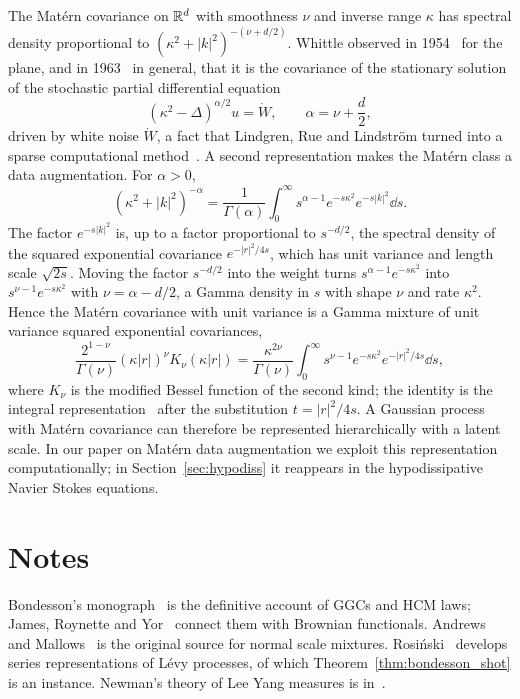 The Mat\'ern covariance on $\mathbb{R}^d$ with smoothness $\nu$ and inverse range $\kappa$ has spectral density proportional to $(\kappa^2 + |k|^2)^{-(\nu+d/2)}$. Whittle observed in 1954~\cite{whittle1954} for the plane, and in 1963~\cite{whittle1963} in general, that it is the covariance of the stationary solution of the stochastic partial differential equation
\[
(\kappa^2 - \Delta)^{\alpha/2}u = \dot W,\qquad\alpha = \nu + \frac d2,
\]
driven by white noise $\dot W$, a fact that Lindgren, Rue and Lindstr\"om turned into a sparse computational method~\cite{lindgrenrue2011}. A second representation makes the Mat\'ern class a data augmentation. For $\alpha>0$,
\[
(\kappa^2+|k|^2)^{-\alpha} = \frac{1}{\Gamma(\alpha)}\int_0^\infty s^{\alpha-1}e^{-s\kappa^2}e^{-s|k|^2}\dd s.
\]
The factor $e^{-s|k|^2}$ is, up to a factor proportional to $s^{-d/2}$, the spectral density of the squared exponential covariance $e^{-|r|^2/4s}$, which has unit variance and length scale $\sqrt{2s}$. Moving the factor $s^{-d/2}$ into the weight turns $s^{\alpha-1}e^{-s\kappa^2}$ into $s^{\nu-1}e^{-s\kappa^2}$ with $\nu = \alpha-d/2$, a Gamma density in $s$ with shape $\nu$ and rate $\kappa^2$. Hence the Mat\'ern covariance with unit variance is a Gamma mixture of unit variance squared exponential covariances,
\[
\frac{2^{1-\nu}}{\Gamma(\nu)}(\kappa|r|)^\nu K_\nu(\kappa|r|) = \frac{\kappa^{2\nu}}{\Gamma(\nu)}\int_0^\infty s^{\nu-1}e^{-s\kappa^2}e^{-|r|^2/4s}\dd s,
\]
where $K_\nu$ is the modified Bessel function of the second kind; the identity is the integral representation~\cite[10.32.10]{dlmf} after the substitution $t = |r|^2/4s$. A Gaussian process with Mat\'ern covariance can therefore be represented hierarchically with a latent scale. In our paper on Mat\'ern data augmentation we exploit this representation computationally; in Section~\ref{sec:hypodiss} it reappears in the hypodissipative Navier Stokes equations.



\section*{Notes}

Bondesson's monograph~\cite{bondesson1992} is the definitive account of GGCs and HCM laws; James, Roynette and Yor~\cite{jamesroynetteyor2008} connect them with Brownian functionals. Andrews and Mallows~\cite{andrewsmallows1974} is the original source for normal scale mixtures. Rosi\'nski~\cite{rosinski2001} develops series representations of L\'evy processes, of which Theorem~\ref{thm:bondesson_shot} is an instance. Newman's theory of Lee Yang measures is in~\cite{newman1974,newman1976}.
